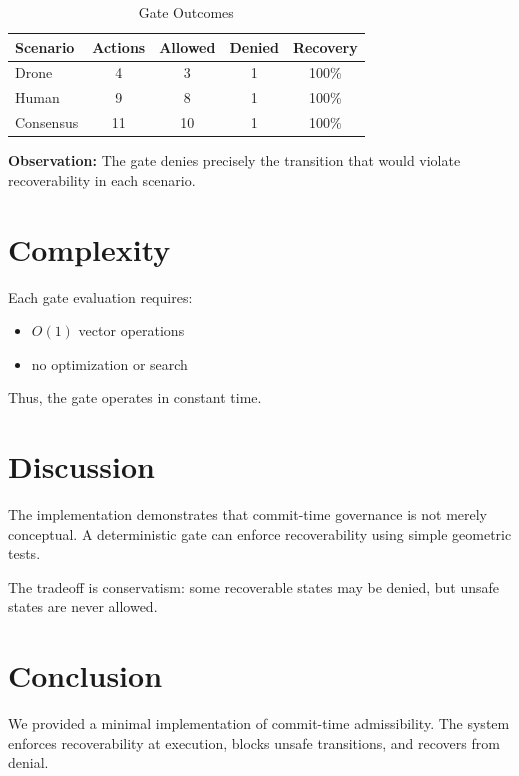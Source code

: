 \documentclass[letterpaper, 10 pt, conference]{ieeeconf}
\begin{document}
\begin{table}[h]
\centering
\caption{Gate Outcomes}
\begin{tabular}{lcccc}
\toprule
Scenario & Actions & Allowed & Denied & Recovery \\
\midrule
Drone & 4 & 3 & 1 & 100\% \\
Human & 9 & 8 & 1 & 100\% \\
Consensus & 11 & 10 & 1 & 100\% \\
\bottomrule
\end{tabular}
\end{table}

\textbf{Observation:}
The gate denies precisely the transition that would violate recoverability in each scenario.

\section{Complexity}

Each gate evaluation requires:
\begin{itemize}
\item $O(1)$ vector operations
\item no optimization or search
\end{itemize}

Thus, the gate operates in constant time.

\section{Discussion}

The implementation demonstrates that commit-time governance is not merely conceptual. A deterministic gate can enforce recoverability using simple geometric tests.

The tradeoff is conservatism: some recoverable states may be denied, but unsafe states are never allowed.

\section{Conclusion}

We provided a minimal implementation of commit-time admissibility. The system enforces recoverability at execution, blocks unsafe transitions, and recovers from denial.
\end{document}
